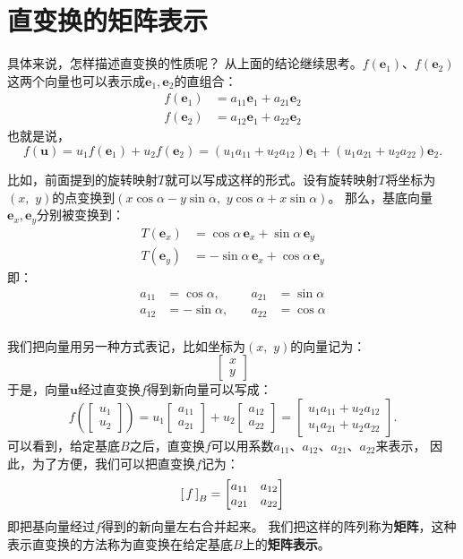 \documentclass[12pt,UTF8,fontset=none]{ctexbook}
\begin{document}
\section{直变换的矩阵表示}

具体来说，怎样描述直变换的性质呢？
从上面的结论继续思考。$f(\mathbf{e}_1)$、$f(\mathbf{e}_2)$这两个向量也可以表示成$\mathbf{e}_1, \mathbf{e}_2$的直组合：
\begin{align*}
    f(\mathbf{e}_1) &= a_{11} \mathbf{e}_1 + a_{21} \mathbf{e}_2  \\
    f(\mathbf{e}_2) &= a_{12} \mathbf{e}_1 + a_{22} \mathbf{e}_2 
\end{align*}
也就是说，
$$ f(\mathbf{u}) = u_1 f(\mathbf{e}_1) + u_2 f(\mathbf{e}_2) = (u_1a_{11} + u_2a_{12}) \mathbf{e}_1 + (u_1a_{21} + u_2a_{22}) \mathbf{e}_2.$$

比如，前面提到的旋转映射$T$就可以写成这样的形式。设有旋转映射$T$将坐标为$(x,\,\, y)$的点变换到$(x\cos{\alpha} - y\sin{\alpha},\,\,y\cos{\alpha} + x\sin{\alpha})$。
那么，基底向量$\mathbf{e}_x, \mathbf{e}_y$分别被变换到：
\begin{align*}
    T(\mathbf{e}_x) &= \cos{\alpha}\,\mathbf{e}_x + \sin{\alpha}\,\mathbf{e}_y  \\
    T(\mathbf{e}_y) &= -\sin{\alpha}\,\mathbf{e}_x + \cos{\alpha}\,\mathbf{e}_y  
\end{align*}
即：
$$
\begin{array}{rlrl}
    a_{11} &= \cos{\alpha}, \quad & a_{21} &= \sin{\alpha} \\
    a_{12} &= -\sin{\alpha}, \quad & a_{22} &= \cos{\alpha} \\
\end{array}
$$

我们把向量用另一种方式表记，比如坐标为$(x, \,\,y)$的向量记为：
$$ \begin{bmatrix}
    x\\ y
\end{bmatrix}$$
于是，向量$\mathbf{u}$经过直变换$f$得到新向量可以写成：
$$ f\left(\begin{bmatrix}
    u_1\\ u_2
\end{bmatrix}\right) = u_1\begin{bmatrix}
    a_{11}\\ a_{21}
\end{bmatrix} + u_2 \begin{bmatrix}
    a_{12}\\ a_{22}
\end{bmatrix} = \begin{bmatrix}
    u_1a_{11} + u_2a_{12}\\ u_1a_{21} + u_2a_{22} 
\end{bmatrix}.$$
可以看到，给定基底$B$之后，直变换$f$可以用系数$a_{11}$、$a_{12}$、$a_{21}$、$a_{22}$来表示，
因此，为了方便，我们可以把直变换$f$记为：
$$
\bmat{f}[B] = 
\begin{bmatrix}
    a_{11} & a_{12} \\ a_{21} & a_{22}
\end{bmatrix}
$$
即把基向量经过$f$得到的新向量左右合并起来。
我们把这样的阵列称为\textbf{矩阵}，这种表示直变换的方法称为直变换在给定基底$B$上的\textbf{矩阵表示}。
\end{document}
